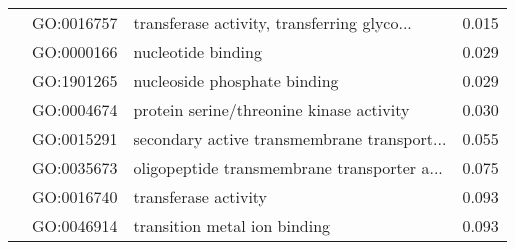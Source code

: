 \begin{longtable}{lllr}
   & GO:0016757 &  transferase activity, transferring glyco... &         0.015 \\
   & GO:0000166 &                           nucleotide binding &         0.029 \\
   & GO:1901265 &                 nucleoside phosphate binding &         0.029 \\
   & GO:0004674 &     protein serine/threonine kinase activity &         0.030 \\
   & GO:0015291 &  secondary active transmembrane transport... &         0.055 \\
   & GO:0035673 &  oligopeptide transmembrane transporter a... &         0.075 \\
   & GO:0016740 &                         transferase activity &         0.093 \\
   & GO:0046914 &                 transition metal ion binding &         0.093 \\
\end{longtable}
